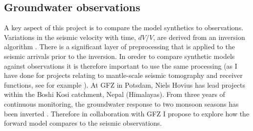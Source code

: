 \subsection{Groundwater observations}

A key aspect of this project is to compare the model synthetics to observations. Variations in the seismic velocity with time, $dV/V$, are derived from an inversion algorithm \citep[e.g.][]{lecocq-etal-2017,clements-2018}. There is a significant layer of preprocessing that is applied to the seismic arrivals prior to the inversion. In oreder to compare synthetic models against observations it is therefore important to use the same processing (as I have done for projects relating to mantle-scale seismic tomography and receiver functions, see for example \citealp{goes-etal-2012,armitage-etal-2015,civiero-etal-2019}). At GFZ in Potsdam, Niels Hovius has lead projects within the Boshi Kosi catchment, Nepal (Himalayas). From three years of continuous monitoring, the groundwater response to two monsoon seasons has been inverted \citep{illien-etal-2020}. Therefore in collaboration with GFZ I propose to explore how the forward model compares to the seismic observations.

